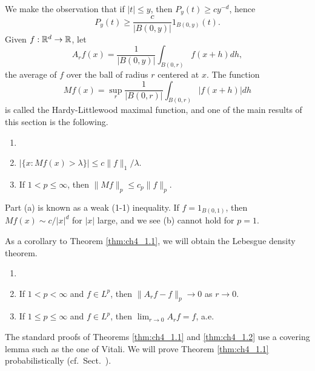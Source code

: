 We make the observation that if $|t| \leq y$, then $P_y(t) \geq cy^{-d}$, hence
\begin{equation}\label{eq:ch4_1.2}
    P_y(t) \geq \frac{c}{|B(0,y)|} 1_{B(0,y)}(t).
\end{equation}
Given $f : \mathbb{R}^d \to \mathbb{R}$, let
\begin{equation}\label{eq:ch4_1.3}
    A_r f(x) = \frac{1}{|B(0,y)|} \int_{B(0,r)} f(x+h)dh,
\end{equation}
the average of $f$ over the ball of radius $r$ centered at $x$. The function
\begin{equation}\label{eq:ch4_1.4}
    Mf(x) = \sup_r \frac{1}{|B(0,r)|} \int_{B(0,r)} |f(x+h)|dh
\end{equation}
is called the Hardy-Littlewood maximal function, and one of the main results of this section is the following.

\begin{theorem}\label{thm:ch4_1.1}
\begin{enumerate}
    \item[]
    \item $|\{x : Mf(x) > \lambda\}| \leq c\|f\|_1/\lambda$.
    \item If $1 < p \leq \infty$, then $\|Mf\|_p \leq c_p\|f\|_p$.
\end{enumerate}
\end{theorem}

Part (a) is known as a weak (1-1) inequality. If $f = 1_{B(0,1)}$, then $Mf(x) \sim c/|x|^d$ for $|x|$ large, and we see (b) cannot hold for $p=1$.

As a corollary to Theorem \ref{thm:ch4_1.1}, we will obtain the Lebesgue density theorem.

\begin{theorem}\label{thm:ch4_1.2}
\begin{enumerate}
    \item[]
    \item If $1 < p < \infty$ and $f \in L^p$, then $\|A_r f - f\|_p \to 0$ as $r \to 0$.
    \item If $1 \leq p \leq \infty$ and $f \in L^p$, then $\lim_{r\to 0} A_r f = f$, a.e.
\end{enumerate}
\end{theorem}

The standard proofs of Theorems \ref{thm:ch4_1.1} and \ref{thm:ch4_1.2} use a covering lemma such as the one of Vitali. We will prove Theorem \ref{thm:ch4_1.1} probabilistically (cf.\ Sect.\ ).

